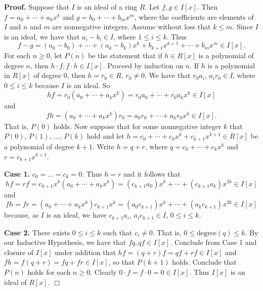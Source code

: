 \documentclass[9pt]{article}
\newcommand{\qed}{\hfill \ensuremath{\Box}}
\begin{document}
\begin{enumerate}
      \textbf{Proof.} Suppose that $I$ is an ideal of a ring $R$. Let
      $f, g \in I[x]$. Then $f = a_0 + \cdots + a_kx^k$ and
      $g = b_0 + \cdots + b_mx^m$, where the coefficients are elements of $I$
      and $n$ and $m$ are nonnegative integers. Assume without loss that
      $k \le m$. Since $I$ is an ideal, we have that $a_i - b_i \in I$, where
      $1 \le i \le k$. Thus
      $$f - g = (a_0 - b_0) + \cdots + (a_k - b_k)x^k + b_{k + 1}x^{k + 1} +
        \cdots + b_mx^m \in I[x].$$
      For each $n \ge 0$, let $P(n)$ be the statement that if $h \in R[x]$ is 
      a polynomial of degree $n$, then $h \cdot f, f \cdot h \in I[x]$. Proceed
      by induction on $n$. If $h$ is a polynomial in $R[x]$ of degree 0, then
      $h = r_0 \in R$, $r_0 \neq 0$. We have
      that $r_0a_i$, $a_ir_0 \in I$, where $0 \le i \le k$ because $I$ is an
      ideal. So
      $$hf = r_0(a_0 + \cdots + a_kx^k) =  r_0a_0 + \cdots + r_0a_kx^k\in I[x]$$
      and
      $$fh = (a_0 + \cdots + a_kx^k)r_0 =  a_0r_0 + \cdots +a_kr_0x^k\in I[x].$$
      That is, $P(0)$ holds. Now suppose that for some nonnegative integer $k$
      that $P(0)$, $P(1)$, $\ldots$, $P(k)$ hold and let $h = c_0 + \cdots + 
      c_kx^k + c_{k+1}x^{k+1} \in R[x]$ be a polynomial of degree $k + 1$. Write
      $h = q + r$, where $q = c_0 + \cdots + c_kx^k$ and $r = c_{k+1}x^{k+1}$.

      \textbf{Case 1.} $c_0 = \ldots = c_k = 0$. Thus $h = r$ and it follows
      that
      $$hf = rf = c_{k+1}x^k(a_0 + \cdots + a_kx^k) = (c_{k+1}a_0)x^k + \cdots +
         (c_{k+1}a_k)x^{2k} \in I[x]$$
      and
      $$fh = fr = (a_0 + \cdots + a_kx^k)c_{k+1}x^k = (a_0c_{k+1})x^k + \cdots +
         (a_kc_{k+1})x^{2k} \in I[x]$$
      because, as $I$ is an ideal, we have
      $c_{k+1}a_i$, $a_ic_{k+1} \in I$, $0 \le i \le k$.

      \textbf{Case 2.} There exists $0 \le i \le k$ such that $c_i \neq 0$. That 
      is, $0 \le \text{degree}(q) \le k$. By our Inductive Hypothesis, we have
      that $fq, qf \in I[x]$. Conclude from Case 1 and closure of $I[x]$ under
      addition that $hf = (q + r)f = qf +  rf \in I[x]$ and
      $fh = f(q + r) = fq + fr \in I[x]$, so that $P(k + 1)$ holds. Conclude
      that $P(n)$ holds for each $n \ge 0$. Clearly
      $0 \cdot f = f \cdot 0 = 0 \in I[x]$. Thus $I[x]$ is an ideal of $R[x]$.
      \qed
\end{enumerate}
\end{document}
